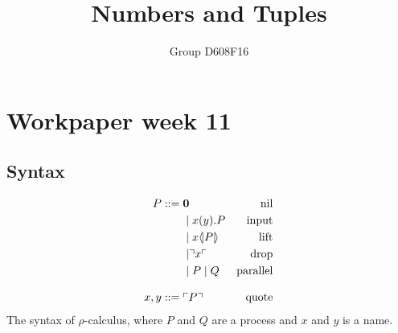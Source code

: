 

\author{Group D608F16}
\title{Numbers and Tuples}



\maketitle

\section{Workpaper week 11}
\subsection{Syntax}
\begin{align*}
P  ::= \; &  \mathbf{0} & \text{nil} \\
  & \mid x(y).P & \text{input} \\
  & \mid x \langle \! | P | \! \rangle & \text{lift} \\
  & \mid \urcorner x \ulcorner & \text{drop} \\
  & \mid P \mid Q & \text{parallel} \\[3mm]
x,y ::= \; & \ulcorner P \urcorner & \text{quote}
\end{align*}
The syntax of $\rho$-calculus, where $P$ and $Q$ are a process and $x$ and $y$ is a name.\citep{Meredith2005}



%



\grid
\grid
